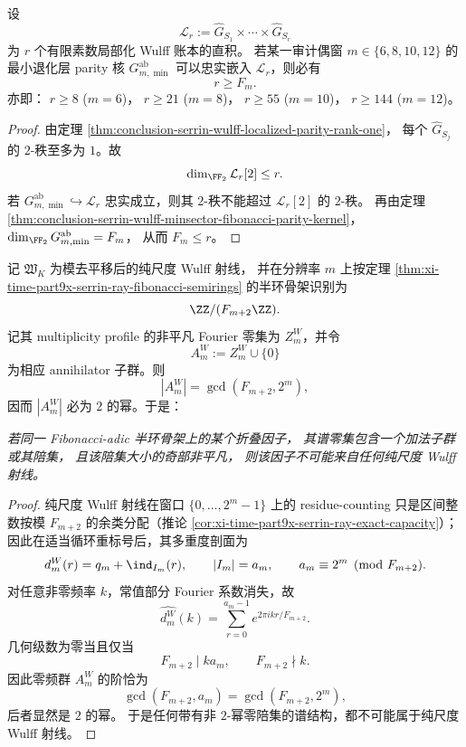\begin{corollary}\label{cor:conclusion-serrin-wulff-finite-localized-product-insufficient}
设
\[
\mathcal L_r
:=\widehat G_{S_1}\times\cdots\times \widehat G_{S_r}
\]
为 \(r\) 个有限素数局部化 Wulff 账本的直积。
若某一审计偶窗 \(m\in\{6,8,10,12\}\) 的最小退化层 parity 核
\(G_{m,\min}^{\mathrm{ab}}\) 可以忠实嵌入 \(\mathcal L_r\)，则必有
\[
r\ge F_m.
\]
亦即：
\(r\ge 8\) (\(m=6\))，
\(r\ge 21\) (\(m=8\))，
\(r\ge 55\) (\(m=10\))，
\(r\ge 144\) (\(m=12\))。
\end{corollary}
\begin{proof}
由定理 \ref{thm:conclusion-serrin-wulff-localized-parity-rank-one}，
每个 \(\widehat G_{S_j}\) 的 \(2\)-秩至多为 \(1\)。故
\[
\dim_{\FF_2}\mathcal L_r[2]\le r.
\]
若
\(G_{m,\min}^{\mathrm{ab}}\hookrightarrow \mathcal L_r\)
忠实成立，则其 \(2\)-秩不能超过 \(\mathcal L_r[2]\) 的 \(2\)-秩。
再由定理 \ref{thm:conclusion-serrin-wulff-minsector-fibonacci-parity-kernel}，
\(\dim_{\FF_2}G_{m,\min}^{\mathrm{ab}}=F_m\)，
从而 \(F_m\le r\)。
\end{proof}

\begin{theorem}[奇因子零陪集障碍]\label{thm:conclusion-serrin-wulff-odd-coset-obstruction}
记 \(\mathfrak W_K\) 为模去平移后的纯尺度 Wulff 射线，
并在分辨率 \(m\) 上按定理 \ref{thm:xi-time-part9x-serrin-ray-fibonacci-semirings}
的半环骨架识别为
\[
\ZZ/(F_{m+2}\ZZ).
\]
记其 multiplicity profile 的非平凡 Fourier 零集为 \(Z_m^{W}\)，并令
\[
A_m^{W}:=Z_m^{W}\cup\{0\}
\]
为相应 annihilator 子群。则
\[
|A_m^{W}|=\gcd(F_{m+2},2^m),
\]
因而 \(|A_m^{W}|\) 必为 \(2\) 的幂。于是：

\emph{若同一 Fibonacci-adic 半环骨架上的某个折叠因子，
其谱零集包含一个加法子群或其陪集，
且该陪集大小的奇部非平凡，
则该因子不可能来自任何纯尺度 Wulff 射线。}
\end{theorem}
\begin{proof}
纯尺度 Wulff 射线在窗口 \(\{0,\dots,2^m-1\}\) 上的 residue-counting
只是区间整数按模 \(F_{m+2}\) 的余类分配（推论 \ref{cor:xi-time-part9x-serrin-ray-exact-capacity}）；
因此在适当循环重标号后，其多重度剖面为
\[
d_m^{W}(r)=q_m+\ind_{I_m}(r),
\qquad
|I_m|=a_m,
\qquad
a_m\equiv 2^m\pmod{F_{m+2}}.
\]
对任意非零频率 \(k\)，常值部分 Fourier 系数消失，故
\[
\widehat{d_m^{W}}(k)
=\sum_{r=0}^{a_m-1}e^{2\pi i kr/F_{m+2}}.
\]
几何级数为零当且仅当
\[
F_{m+2}\mid k a_m,
\qquad
F_{m+2}\nmid k.
\]
因此零频群 \(A_m^W\) 的阶恰为
\[
\gcd(F_{m+2},a_m)=\gcd(F_{m+2},2^m),
\]
后者显然是 \(2\) 的幂。
于是任何带有非 \(2\)-幂零陪集的谱结构，都不可能属于纯尺度 Wulff 射线。
\end{proof}

